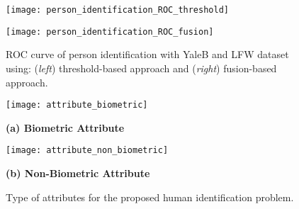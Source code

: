 \begin{figure*}[!t]
  \centering
  \begin{minipage}{2.0\columnwidth}
    \begin{minipage}{0.5\columnwidth}
      \begin{minipage}{0.9\columnwidth}  \centerline{\texttt{[image: person\_identification\_ROC\_threshold]}} \end{minipage}
    \end{minipage}
    \hfill
    \begin{minipage}{0.5\columnwidth}
      \begin{minipage}{0.9\columnwidth}  \centerline{\texttt{[image: person\_identification\_ROC\_fusion]}}    \end{minipage}
    \end{minipage}
  \end{minipage}
  \vspace{-2ex}
  \caption
    {
    \small
    ROC curve of person identification with YaleB and LFW dataset using: 
    ({\it left}) threshold-based approach and ({\it right}) fusion-based approach.
    }
  \label{fig:results_identification_ROC}
\end{figure*}


\begin{figure*}[!t]  
  \centering
  \begin{minipage}{2.0\columnwidth}
    \begin{minipage}{0.4\columnwidth}
      \centerline{\texttt{[image: attribute\_biometric]}}
      \centerline{\scriptsize {\bf (a) Biometric Attribute}}
    \end{minipage}    
    \hfill
    \begin{minipage}{0.59\columnwidth}
      \centerline{\texttt{[image: attribute\_non\_biometric]}}
      \centerline{\scriptsize {\bf (b) Non-Biometric Attribute}}
    \end{minipage}    
  \end{minipage}
  \vspace{-1ex}
  \caption
    {
    \small
    Type of attributes for the proposed human identification problem.
    }
  \label{fig:attribute_types}
\end{figure*}
